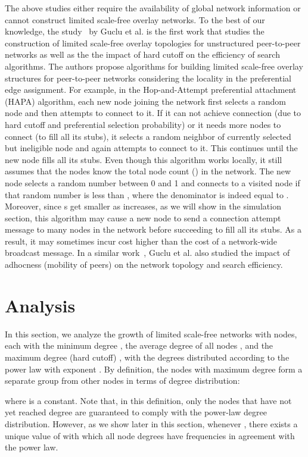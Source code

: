 \documentclass[10pt,journal,cspaper,compsoc]{IEEEtran}
\begin{document}
The above studies either require the availability of global network information or cannot construct limited scale-free overlay networks. To the best of our knowledge, the study~\cite{guclu} by Guclu et al. is the first work that studies the construction of limited scale-free overlay topologies for unstructured peer-to-peer networks as well as the the impact of hard cutoff on the  efficiency of search algorithms. The authors propose algorithms for building limited scale-free overlay structures for peer-to-peer networks considering the locality in the preferential edge assignment. For example, in the Hop-and-Attempt preferential attachment (HAPA) algorithm, each new node joining the network first selects a random node and then attempts to connect to it. If it can not achieve connection (due to hard cutoff and preferential selection probability) or it needs more nodes to connect (to fill all its  stubs), it selects a random neighbor of currently selected but ineligible node and again attempts to connect to it. This continues until the new node fills all its stubs. Even though this algorithm works locally, it still assumes that the nodes know the total node count () in the network. The new node selects a random number between 0 and 1 and connects to a visited node  if that random number is less than , where the denominator is indeed equal to . Moreover, since s get smaller as  increases, as we will show in the simulation section, this algorithm may cause a new node to send a connection attempt message to many nodes in the network before succeeding to fill all its stubs. As a result, it may sometimes incur cost higher than the cost of a network-wide broadcast message. In a similar work~\cite{adhoc}, Guclu et al. also studied the impact of adhocness (mobility of peers) on the network topology and search efficiency.



\section{Analysis}
\label{sec:analysis}

In this section, we analyze the growth of limited scale-free networks with  nodes, each with the minimum degree , the average degree of all nodes , and the  maximum degree (hard cutoff) , with the degrees distributed according to the power law with exponent . By definition, the nodes with maximum degree form a separate group from other nodes in terms of degree distribution:

where  is a constant. Note that, in this definition, only the nodes that have not yet reached degree  are guaranteed to comply with the power-law degree distribution. 
However, as we show later in this section, whenever , there exists a unique value of  with which all node degrees have frequencies in agreement with the power law.
\end{document}
